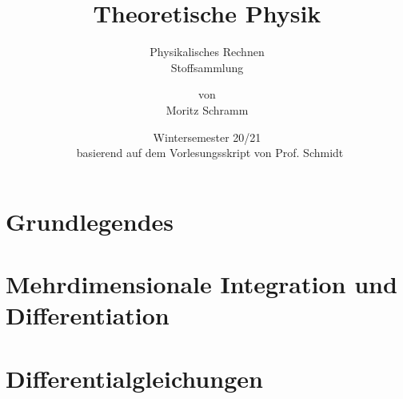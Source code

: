 \documentclass[a4paper, 12pt]{report}
\institute{Universität Bayreuth}
\title{Theoretische Physik}
\subtitle{Physikalisches Rechnen\\Stoffsammlung}
\author{von\\Moritz Schramm}%
\date{Wintersemester 20/21 \\ \small basierend auf dem Vorlesungsskript von Prof. Schmidt}
\begin{document}
    \maketitle
    \romantableofcontents

    \chapter{Grundlegendes}
    
    
    \chapter{Mehrdimensionale Integration und Differentiation}
    
    
	\chapter{Differentialgleichungen}
	
\end{document}
